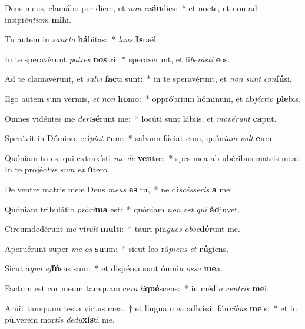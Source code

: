 \item Deus meus, clamábo per diem, et \textit{non} \textit{ex}\textbf{áu}dies:~* et nocte, et non ad insipi\textit{én}\textit{ti}\textit{am} \textbf{mi}hi.
\item Tu autem in \textit{sanc}\textit{to} \textbf{há}bitas:~* \textit{laus} \textbf{Is}raël.
\item In te speravérunt \textit{pa}\textit{tres} \textbf{nos}tri:~* speravérunt, et li\textit{be}\textit{rás}\textit{ti} \textbf{e}os.
\item Ad te clamavérunt, et \textit{sal}\textit{vi} \textbf{fac}ti sunt:~* in te speravérunt, et \textit{non} \textit{sunt} \textit{con}\textbf{fú}si.
\item Ego autem sum vermis, \textit{et} \textit{non} \textbf{ho}mo:~* oppróbrium hóminum, et ab\textit{jéc}\textit{ti}\textit{o} \textbf{ple}bis.
\item Omnes vidéntes me \textit{de}\textit{ri}\textbf{sé}runt me:~* locúti sunt lábiis, et \textit{mo}\textit{vé}\textit{runt} \textbf{ca}put.
\item Sperávit in Dómino, erí\textit{pi}\textit{at} \textbf{e}um:~* salvum fáciat eum, quón\textit{i}\textit{am} \textit{vult} \textbf{e}um.
\item Quóniam tu es, qui extraxísti \textit{me} \textit{de} \textbf{ven}tre:~* spes mea ab ubéribus matris meæ. In te projéc\textit{tus} \textit{sum} \textit{ex} \textbf{ú}tero.
\item De ventre matris meæ Deus \textit{me}\textit{us} \textbf{es} tu,~* ne di\textit{scés}\textit{se}\textit{ris} \textbf{a} me:
\item Quóniam tribulátio \textit{pró}\textit{xi}\textbf{ma} est:~* quóniam \textit{non} \textit{est} \textit{qui} \textbf{ád}juvet.
\item Circumdedérunt me ví\textit{tu}\textit{li} \textbf{mul}ti:~* tauri pin\textit{gues} \textit{ob}\textit{se}\textbf{dé}runt me.
\item Aperuérunt super \textit{me} \textit{os} \textbf{su}um:~* sicut leo rá\textit{pi}\textit{ens} \textit{et} \textbf{rú}giens.
\item Sicut a\textit{qua} \textit{ef}\textbf{fú}sus sum:~* et dispérsa sunt ómni\textit{a} \textit{os}\textit{sa} \textbf{me}a.
\item Factum est cor meum tamquam ce\textit{ra} \textit{li}\textbf{qué}scens:~* in médi\textit{o} \textit{ven}\textit{tris} \textbf{me}i.
\item Aruit tamquam testa virtus mea,~† et lingua mea adhǽsit fáu\textit{ci}\textit{bus} \textbf{me}is:~* et in púlverem mor\textit{tis} \textit{de}\textit{du}\textbf{xís}ti me.
